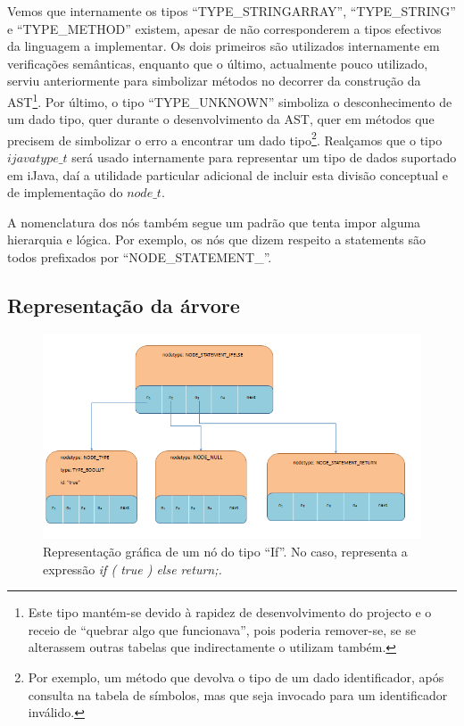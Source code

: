 \documentclass[11pt,a4paper]{article}
\begin{document}
Vemos que internamente os tipos ``TYPE\_STRINGARRAY'', ``TYPE\_STRING'' e ``TYPE\_METHOD'' existem, apesar de não corresponderem a tipos efectivos da linguagem a implementar. Os dois primeiros são utilizados internamente em verificações semânticas, enquanto que o último, actualmente pouco utilizado, serviu anteriormente para simbolizar métodos no decorrer da construção da AST\footnote{Este tipo mantém-se devido à rapidez de desenvolvimento do projecto e o receio de ``quebrar algo que funcionava'', pois poderia remover-se, se se alterassem outras tabelas que indirectamente o utilizam também.}. Por último, o tipo ``TYPE\_UNKNOWN'' simboliza o desconhecimento de um dado tipo, quer durante o desenvolvimento da AST, quer em métodos que precisem de simbolizar o erro a encontrar um dado tipo\footnote{Por exemplo, um método que devolva o tipo de um dado identificador, após consulta na tabela de símbolos, mas que seja invocado para um identificador inválido.}. Realçamos que o tipo $ijavatype\_t$ será usado internamente para representar um tipo de dados suportado em iJava, daí a utilidade particular adicional de incluir esta divisão conceptual e de implementação do $node\_t$.

A nomenclatura dos nós também segue um padrão que tenta impor alguma hierarquia e lógica. Por exemplo, os nós que dizem respeito a statements são todos prefixados por ``NODE\_STATEMENT\_''.

\subsection{Representação da árvore}

\begin{figure}[H]
  \centering
      \includegraphics[width=\textwidth,height=\textheight,keepaspectratio]{If_Statement.png}
  \caption{Representação gráfica de um nó do tipo ``If''. No caso, representa a expressão \emph{if ( true ) {} else return;.}}
\end{figure}
\end{document}
